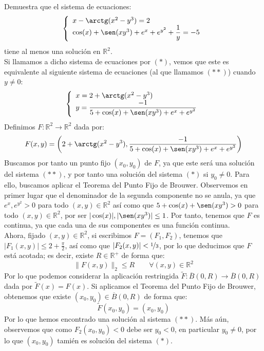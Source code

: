 \begin{ejercicio}
    Demuestra que el sistema de ecuaciones:
    \begin{equation*}
        \left\{\begin{array}{l}
            x-\arctg(x^2-y^3) = 2 \\
            \cos(x) + \sen(xy^3) + e^x + e^{y^2} + \dfrac{1}{y} = -5
        \end{array}\right.
    \end{equation*}
    tiene al menos una solución en $\mathbb{R}^2$.\\

    \noindent
    Si llamamos a dicho sistema de ecuaciones por $(\ast)$, vemos que este es equivalente al siguiente sistema de ecuaciones (al que llamamos $(\ast\ast)$) cuando $y\neq 0$:
    \begin{equation*}
        \left\{\begin{array}{l}
            x = 2 + \arctg(x^2-y^3) \\
            y = \dfrac{-1}{5+\cos(x) + \sen(xy^3) + e^x + e^{y^2}}
        \end{array}\right.
    \end{equation*}
    Definimos $F:\mathbb{R}^2\to \mathbb{R}^2$ dada por:
    \begin{equation*}
        F(x,y) = \left(2 + \arctg(x^2-y^3), \dfrac{-1}{5+\cos(x) + \sen(xy^3) + e^x + e^{y^2}}\right)
    \end{equation*}
    Buscamos por tanto un punto fijo $(x_0,y_0)$ de $F$, ya que este será una solución del sistema $(\ast\ast)$, y por tanto una solución del sistema $(\ast)$ si $y_0\neq 0$. Para ello, buscamos aplicar el Teorema del Punto Fijo de Brouwer. Observemos en primer lugar que el denominador de la segunda componente no se anula, ya que $e^x,e^{y^2}>0$ para todo $(x,y)\in \mathbb{R}^2$ así como que $5+\cos(x)+\sen(xy^3)>0$ para todo $(x,y)\in \mathbb{R}^2$, por ser $|\cos(x)|,|\sen(xy^3)|\leq 1$. Por tanto, tenemos que $F$ es continua, ya que cada una de sus componentes es una función continua.\\

    \noindent
    Ahora, fijado $(x,y)\in \mathbb{R}^2$, si escribimos $F=(F_1,F_2)$, tenemos que $|F_1(x,y)| \leq 2+\frac{\pi}{2}$, así como que $|F_2(x,y)|<\nicefrac{1}{3}$, por lo que deducimos que $F$ está acotada; es decir, existe $R\in \mathbb{R}^+$ de forma que:
    \begin{equation*}
        \|F(x,y)\|_2 \leq R \qquad \forall (x,y)\in \mathbb{R}^2
    \end{equation*}
    Por lo que podemos considerar la aplicación restringida $\tilde{F}:\overline{B}(0,R)\to \overline{B}(0,R)$ dada por $\tilde{F}(x) = F(x)$. Si aplicamos el Teorema del Punto Fijo de Brouwer, obtenemos que existe $(x_0,y_0)\in \overline{B}(0,R)$ de forma que:
    \begin{equation*}
        \tilde{F}(x_0,y_0) = (x_0,y_0)
    \end{equation*}
    Por lo que hemos encontrado una solución al sistema $(\ast\ast)$. Más aún, observemos que como $F_2(x_0,y_0)<0$ debe ser $y_0<0$, en particular $y_0\neq 0$, por lo que $(x_0,y_0)$ tamién es solución del sistema $(\ast)$.
\end{ejercicio}

